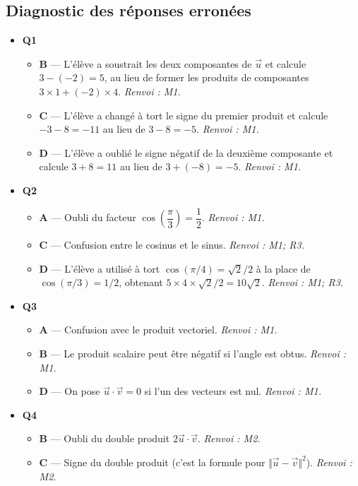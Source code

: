 \subsection*{Diagnostic des réponses erronées}

\begin{itemize}
  \item \textbf{Q1}
  \begin{itemize}
    \item \textbf{B} — L'élève a soustrait les deux composantes de $\vec u$ et calcule $3-(-2)=5$, au lieu de former les produits de composantes $3\times1+(-2)\times4$. \emph{Renvoi : M1.}
    \item \textbf{C} — L'élève a changé à tort le signe du premier produit et calcule $-3-8=-11$ au lieu de $3-8=-5$. \emph{Renvoi : M1.}
    \item \textbf{D} — L'élève a oublié le signe négatif de la deuxième composante et calcule $3+8=11$ au lieu de $3+(-8)=-5$. \emph{Renvoi : M1.}
  \end{itemize}
  \item \textbf{Q2}
  \begin{itemize}
    \item \textbf{A} — Oubli du facteur $\cos\!\left(\dfrac{\pi}{3}\right) = \dfrac{1}{2}$. \emph{Renvoi : M1.}
    \item \textbf{C} — Confusion entre le cosinus et le sinus. \emph{Renvoi : M1; R3.}
    \item \textbf{D} — L'élève a utilisé à tort $\cos(\pi/4)=\sqrt{2}/2$ à la place de $\cos(\pi/3)=1/2$, obtenant $5\times4\times\sqrt{2}/2=10\sqrt{2}$. \emph{Renvoi : M1; R3.}
  \end{itemize}
  \item \textbf{Q3}
  \begin{itemize}
    \item \textbf{A} — Confusion avec le produit vectoriel. \emph{Renvoi : M1.}
    \item \textbf{B} — Le produit scalaire peut être négatif si l'angle est obtus. \emph{Renvoi : M1.}
    \item \textbf{D} — On pose $\vec{u} \cdot \vec{v} = 0$ si l'un des vecteurs est nul. \emph{Renvoi : M1.}
  \end{itemize}
  \item \textbf{Q4}
  \begin{itemize}
    \item \textbf{B} — Oubli du double produit $2\vec{u}\cdot\vec{v}$. \emph{Renvoi : M2.}
    \item \textbf{C} — Signe du double produit (c'est la formule pour $\Vert\vec{u}-\vec{v}\Vert^2$). \emph{Renvoi : M2.}

\end{itemize}
\end{itemize}

